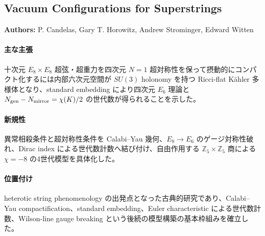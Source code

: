 \subsection{Vacuum Configurations for Superstrings}

\textbf{Authors:} P. Candelas, Gary T. Horowitz, Andrew Strominger, Edward Witten

\paragraph{主な主張}
十次元 $E_8\times E_8$ 超弦・超重力を四次元 $N=1$ 超対称性を保って摂動的にコンパクト化するには内部六次元空間が $SU(3)$ holonomy を持つ Ricci-flat Kähler 多様体となり、standard embedding により四次元 $E_6$ 理論と $N_{\rm gen}-N_{\rm mirror}=\chi(K)/2$ の世代数が得られることを示した\cite{Candelas:1985en}。

\paragraph{新規性}
異常相殺条件と超対称性条件を Calabi--Yau 幾何、$E_8\to E_6$ のゲージ対称性破れ、Dirac index による世代数計数へ結び付け、自由作用する $\mathbb{Z}_5\times\mathbb{Z}_5$ 商による $\chi=-8$ の4世代模型を具体化した。

\paragraph{位置付け}
heterotic string phenomenology の出発点となった古典的研究であり、Calabi--Yau compactification、standard embedding、Euler characteristic による世代数計数、Wilson-line gauge breaking という後続の模型構築の基本枠組みを確立した。
